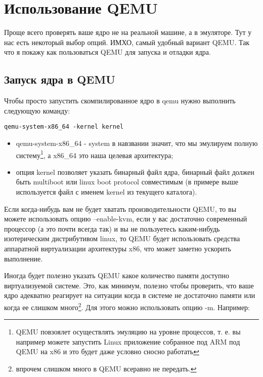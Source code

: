 \section{Использование QEMU}

Проще всего проверять ваше ядро не на реальной машине, а в эмуляторе. Тут у
нас есть некоторый выбор опций. ИМХО, самый удобный вариант QEMU. Так что я
покажу как пользоваться QEMU для запуска и отладки ядра.

\subsection{Запуск ядра в QEMU}

Чтобы просто запустить скомпилированное ядро в qemu нужно выполнить следующую
команду:

\begin{verbatim}
qemu-system-x86_64 -kernel kernel
\end{verbatim}

\begin{itemize}
  \item qemu-system-x86\_64 - system в навзвании значит, что мы эмулируем полную
        систему\footnote{QEMU повзоялет осуществлять эмуляцию на уровне
        процессов, т. е. вы например можете запустить Linux приложение
        собранное под ARM под QEMU на x86 и это будет даже условно сносно
        работать}, а x86\_64 это наша целевая архитектура;
  \item опция kernel позволяет указать бинарный файл ядра, бинарный файл должен
        быть multiboot или linux boot protocol совместимым (в примере выше
        используется файл с именем kernel из текущего каталога).
\end{itemize}

Если когда-нибудь вам не будет хватать производительности QEMU, то вы можете
использовать опцию --enable-kvm, если у вас достаточно современный процессор (а
это почти всегда так) и вы не пользуетесь каким-нибудь изотерическим
дистрибутивом linux, то QEMU будет использовать средства аппаратной
виртуализации архитектуры x86, что может заметно ускорить выполнение.

Иногда будет полезно указать QEMU какое количество памяти доступно
виртуализуемой системе. Это, как минимум, полезно чтобы проверить, что ваше
ядро адекватно реагирует на ситуации когда в системе не достаточно памяти или
когда ее слишком много\footnote{впрочем слишком много в QEMU всеравно не
передать.}. Для этого можно использовать опцию -m. Например:

